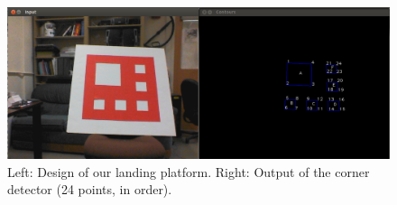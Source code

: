 \documentclass[10pt, twocolumn]{scrartcl} %
\begin{document}
\begin{figure}[h]
    \centering
    \includegraphics[width=\textwidth]{images/corners.png}
    \caption{
        Left: Design of our landing platform.
        Right: Output of the corner detector (24 points, in order).
    }
    \label{fig:corners}
\end{figure}
\end{document}
